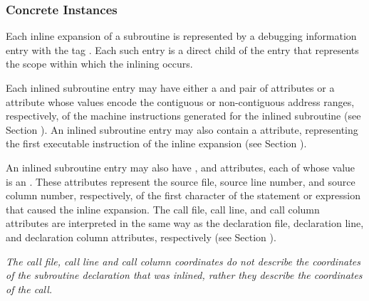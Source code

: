 \subsubsection{Concrete Instances}
\label{chap:concreteinstances}

Each inline expansion of a subroutine is represented
by a debugging information entry with the
tag \DWTAGinlinedsubroutineTARG. Each such entry is a direct
child of the entry that represents the scope within which
the inlining occurs.

Each inlined subroutine entry may have either a
\DWATlowpc{}
and \DWAThighpc{} pair of attributes
or a \DWATranges{}
attribute whose values encode the contiguous or non-contiguous
address ranges, respectively, of the machine instructions
generated for the inlined subroutine (see
Section ).
An\hypertarget{chap:DWATentrypcentryaddressofinlinedsubprogram}{}
inlined subroutine entry may
also
contain
a
\DWATentrypc{}
attribute, representing the first executable instruction of
the inline expansion (see
Section ).

An inlined\hypertarget{chap:DWATcalllinelinenumberofinlinedsubroutinecall}{}
subroutine\hypertarget{chap:DWATcallcolumncolumnpositionofinlinedsubroutinecall}{}
entry\hypertarget{chap:DWATcallfilefilecontaininginlinedsubroutinecall}{}
may also have \DWATcallfileDEFN,
\DWATcalllineDEFN{} and \DWATcallcolumnDEFN{} attributes,
each of whose
value is an .
These attributes represent the
source file, source line number, and source column number,
respectively, of the first character of the statement or
expression that caused the inline expansion. The call file,
call line, and call column attributes are interpreted in
the same way as the declaration file, declaration line, and
declaration column attributes, respectively (see
Section ).

\textit{The call file, call line and call column coordinates do not
describe the coordinates of the subroutine declaration that
was inlined, rather they describe the coordinates of the call.
}

